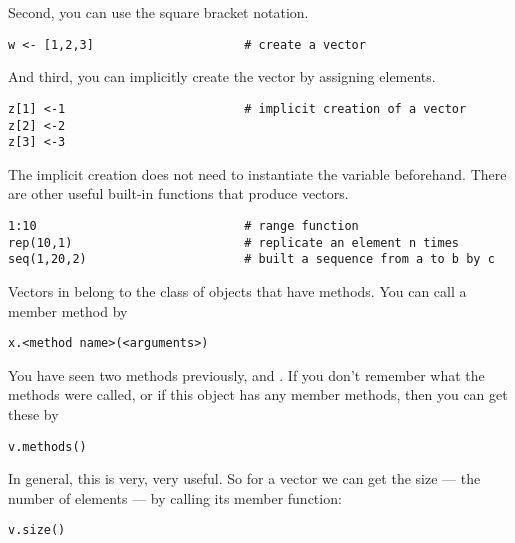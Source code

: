 Second, you can use the square bracket notation.
{\tt \begin{snugshade*}
\begin{lstlisting}    
w <- [1,2,3]                     # create a vector
\end{lstlisting}
\end{snugshade*}}
And third, you can implicitly create the vector by assigning elements.
{\tt \begin{snugshade*}
\begin{lstlisting}    
z[1] <-1                         # implicit creation of a vector
z[2] <-2                   
z[3] <-3                  
\end{lstlisting}
\end{snugshade*}} 
The implicit creation does not need to instantiate the variable beforehand.
There are other useful built-in functions that produce vectors.
{\tt \begin{snugshade*}
\begin{lstlisting}    
1:10                             # range function
rep(10,1)                        # replicate an element n times
seq(1,20,2)                      # built a sequence from a to b by c
\end{lstlisting}
\end{snugshade*}} 

Vectors in \Rev belong to the class of objects that have methods.
You  can call a member method by
{\tt \begin{snugshade*}
\begin{lstlisting}    
x.<method name>(<arguments>)                 
\end{lstlisting}
\end{snugshade*}} 
You have seen two methods previously,  and .
If you don't remember what the methods were called, or if this object has any member methods, then you can get these by
{\tt \begin{snugshade*}
\begin{lstlisting}    
v.methods()                 
\end{lstlisting}
\end{snugshade*}} 
In general, this is very, very useful.
So for a vector we can get the size --- the number of elements --- by calling its member function:
{\tt \begin{snugshade*}
\begin{lstlisting}    
v.size()                 
\end{lstlisting}
\end{snugshade*}} 


